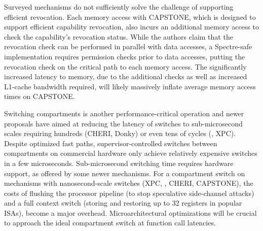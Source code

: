 Surveyed mechanisms do not sufficiently solve the challenge of supporting
efficient revocation.
Each memory access with CAPSTONE, which is designed to support efficient capability 
revocation, also incurs an additional memory access to check the capability's 
revocation status.
While the authors claim that the revocation check can be performed in parallel
with data accesses, a Spectre-safe implementation requires permission checks prior 
to data accesses, putting the revocation check on the critical path to each
memory access.
The significantly increased latency to memory, due to the additional checks as
well as increased L1-cache bandwidth required, will likely massively inflate
average memory access times on CAPSTONE.

Switching compartments is another performance-critical operation and newer
proposals have aimed at reducing the latency of switches to sub-microsecond
scales requiring hundreds (CHERI, Donky) or even tens of 
cycles (\seccells, XPC).
Despite optimized fast paths, supervisor-controlled switches between
compartments on commercial hardware only achieve relatively 
expensive switches in a few microseconds.
Sub-microsecond switching time requires hardware support, as offered by
some newer mechanisms.
For a compartment switch on mechanisms with nanosecond-scale 
switches (XPC, \seccells, CHERI, CAPSTONE), the costs of flushing the 
processor pipeline (to stop speculative side-channel attacks) and a full 
context switch (storing and restoring up to 32 registers in popular ISAs), 
become a major overhead.
Microarchitectural optimizations will be crucial to approach
the ideal compartment switch at function call latencies.

